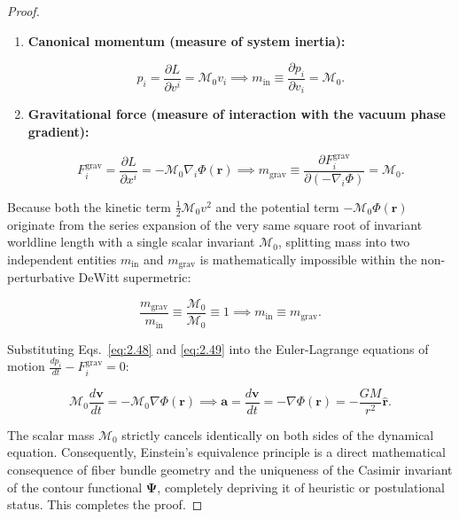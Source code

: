 \documentclass[11pt,a4paper]{article}
\theoremstyle{definition}
\begin{document}
\begin{proof}
\begin{enumerate}
\item \textbf{Canonical momentum (measure of system inertia):}

\begin{equation}\label{eq:2.48}\tag{2.48}
p_i = \frac{\partial L}{\partial v^i} = \mathcal{M}_0 v_i \implies m_{\text{in}} \equiv \frac{\partial p_i}{\partial v_i} = \mathcal{M}_0.
\end{equation}

\item \textbf{Gravitational force (measure of interaction with the vacuum phase gradient):}

\begin{equation}\label{eq:2.49}\tag{2.49}
F_i^{\text{grav}} = \frac{\partial L}{\partial x^i} = -\mathcal{M}_0 \nabla_i \Phi(\mathbf{r}) \implies m_{\text{grav}} \equiv \frac{\partial F_i^{\text{grav}}}{\partial (-\nabla_i \Phi)} = \mathcal{M}_0.
\end{equation}
\end{enumerate}

Because both the kinetic term $\frac{1}{2}\mathcal{M}_0 v^2$ and the potential term $-\mathcal{M}_0 \Phi(\mathbf{r})$ originate from the series expansion of the very same square root of invariant worldline length with a single scalar invariant $\mathcal{M}_0$, splitting mass into two independent entities $m_{\text{in}}$ and $m_{\text{grav}}$ is mathematically impossible within the non-perturbative DeWitt supermetric:

\begin{equation}\label{eq:2.50}\tag{2.50}
\frac{m_{\text{grav}}}{m_{\text{in}}} \equiv \frac{\mathcal{M}_0}{\mathcal{M}_0} \equiv 1 \implies m_{\text{in}} \equiv m_{\text{grav}}.
\end{equation}

Substituting Eqs.~\eqref{eq:2.48} and \eqref{eq:2.49} into the Euler-Lagrange equations of motion $\frac{d p_i}{dt} - F_i^{\text{grav}} = 0$:

\begin{equation}\label{eq:2.51}\tag{2.51}
\mathcal{M}_0 \frac{d\mathbf{v}}{dt} = -\mathcal{M}_0 \nabla \Phi(\mathbf{r}) \implies \mathbf{a} = \frac{d\mathbf{v}}{dt} = -\nabla\Phi(\mathbf{r}) = -\frac{GM}{r^2}\hat{\mathbf{r}}.
\end{equation}

The scalar mass $\mathcal{M}_0$ strictly cancels identically on both sides of the dynamical equation. Consequently, Einstein's equivalence principle is a direct mathematical consequence of fiber bundle geometry and the uniqueness of the Casimir invariant of the contour functional $\mathbf{\Psi}$, completely depriving it of heuristic or postulational status. This completes the proof.
\end{proof}
\end{document}

